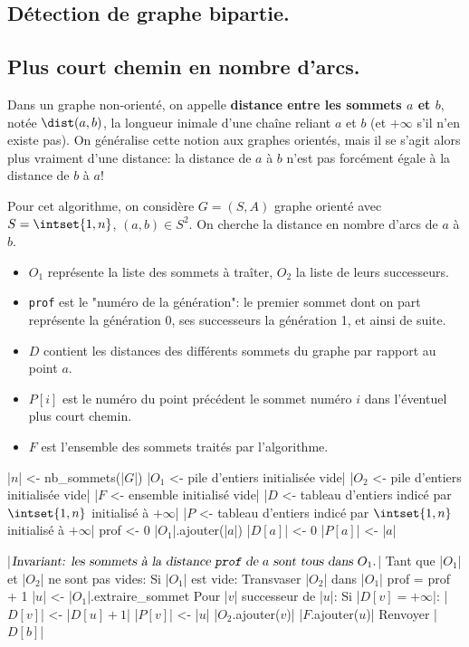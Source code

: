\documentclass{scrartcl}
\begin{document}
		\subsection{Détection de graphe bipartie.}

		\subsection{Plus court chemin en nombre d'arcs.}
			 Dans un graphe non-orienté, on appelle \textbf{distance entre les sommets $a$ et $b$}, notée $\dist(a,b)$,
			la longueur inimale d'une chaîne reliant $a$ et $b$ (et $+\infty$ s'il n'en existe pas).
			On généralise cette notion aux graphes orientés, mais il se s'agit alors plus vraiment d'une distance: 
			la distance de $a$ à $b$ n'est pas forcément égale à la distance de $b$ à $a$! 

			Pour cet algorithme, on considère $G = (S,A)$ graphe orienté avec $S = \intset{1,n}$, $(a,b)\in S^2$.
			On cherche la distance en nombre d'arcs de $a$ à $b$.
			\begin{itemize}
				\item $O_1$ représente la liste des sommets à traîter, $O_2$ la liste de leurs successeurs.
				\item \texttt{prof} est le "numéro de la génération": le premier sommet dont on part représente la génération 0,
				ses successeurs la génération 1, et ainsi de suite.
				\item $D$ contient les distances des différents sommets du graphe par rapport au point $a$.
				\item $P[i]$ est le numéro du point précédent le sommet numéro $i$ dans l'éventuel plus court chemin.
				\item $F$ est l'ensemble des sommets traités par l'algorithme.
			\end{itemize}

			\begin{algotext}
				|$n$| <- nb_sommets(|$G$|)
				|$O_1$ <- pile d'entiers initialisée vide|
				|$O_2$ <- pile d'entiers initialisée vide|
				|$F$ <- ensemble initialisé vide|
				|$D$ <- tableau d'entiers indicé par $\intset{1,n}$ initialisé à $+\infty$|
				|$P$ <- tableau d'entiers indicé par $\intset{1,n}$ initialisé à $+\infty$|
				prof <- 0
				|$O_1$|.ajouter(|$a$|)	
				|$D[a]$| <- 0
				|$P[a]$| <- |$a$|

				|$\textsl{Invariant: les sommets à la distance \texttt{prof} de $a$ sont tous dans $O_1$}.$|
				Tant que |$O_1$| et |$O_2$| ne sont pas vides:
					Si |$O_1$| est vide:
						Transvaser |$O_2$| dans |$O_1$|
						prof = prof + 1
					|$u$| <- |$O_1$|.extraire_sommet
					Pour |$v$| successeur de |$u$|:
						Si |$D[v] = +\infty$|:
							|$D[v]$| <- |$D[u] + 1$|
							|$P[v]$| <- |$u$|
							|$O_2$.ajouter($v$)|
					|$F$.ajouter($u$)|
				Renvoyer |$D[b]$|
			\end{algotext}
			
\end{document}
